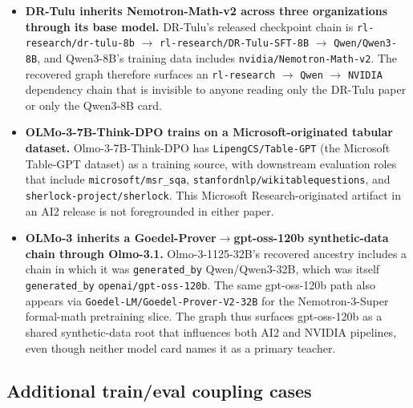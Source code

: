 \begin{itemize}
    \item \textbf{DR-Tulu inherits Nemotron-Math-v2 across three organizations through its base model.}
    DR-Tulu's released checkpoint chain is \texttt{rl-research/dr-tulu-8b} $\rightarrow$ \texttt{rl-research/DR-Tulu-SFT-8B} $\rightarrow$ \texttt{Qwen/Qwen3-8B}, and Qwen3-8B's training data includes \texttt{nvidia/Nemotron-Math-v2}. The recovered graph therefore surfaces an \texttt{rl-research} $\rightarrow$ \texttt{Qwen} $\rightarrow$ \texttt{NVIDIA} dependency chain that is invisible to anyone reading only the DR-Tulu paper or only the Qwen3-8B card.

    \item \textbf{OLMo-3-7B-Think-DPO trains on a Microsoft-originated tabular dataset.}
    Olmo-3-7B-Think-DPO has \texttt{LipengCS/Table-GPT} (the Microsoft Table-GPT dataset) as a training source, with downstream evaluation roles that include \texttt{microsoft/msr\_sqa}, \texttt{stanfordnlp/wikitablequestions}, and \texttt{sherlock-project/sherlock}. This Microsoft Research-originated artifact in an AI2 release is not foregrounded in either paper.

    \item \textbf{OLMo-3 inherits a Goedel-Prover$\rightarrow$gpt-oss-120b synthetic-data chain through Olmo-3.1.}
    Olmo-3-1125-32B's recovered ancestry includes a chain in which it was \texttt{generated\_by} Qwen/Qwen3-32B, which was itself \texttt{generated\_by} \texttt{openai/gpt-oss-120b}. The same gpt-oss-120b path also appears via \texttt{Goedel-LM/Goedel-Prover-V2-32B} for the Nemotron-3-Super formal-math pretraining slice. The graph thus surfaces gpt-oss-120b as a shared synthetic-data root that influences both AI2 and NVIDIA pipelines, even though neither model card names it as a primary teacher.
\end{itemize}

\subsection{Additional train/eval coupling cases}

